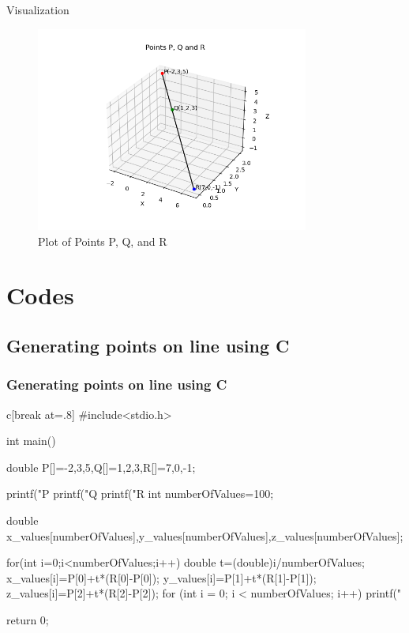\documentclass{beamer}
\theoremstyle{remark}
\numberwithin{equation}{section}
\begin{document}
\begin{frame}{Visualization}
    \begin{figure}
        \centering
        \includegraphics[width=0.8\textwidth]{fig/fig.png} 
	\caption{Plot of Points P, Q, and R}
    \end{figure}
\end{frame}


\section{Codes}
\subsection{Generating points on line using C}

\begin{frame}
\frametitle{Generating points on line using C}
\begin{mintedbox}{c}[break at=.8\textheight]
#include<stdio.h>

int main(){
	double P[]={-2,3,5},Q[]={1,2,3},R[]={7,0,-1};
	
	printf("P %
	printf("Q %
	printf("R %
	int numberOfValues=100;

	double x_values[numberOfValues],y_values[numberOfValues],z_values[numberOfValues];

	for(int i=0;i<numberOfValues;i++){
		double t=(double)i/numberOfValues;
		x_values[i]=P[0]+t*(R[0]-P[0]);
		y_values[i]=P[1]+t*(R[1]-P[1]);
		z_values[i]=P[2]+t*(R[2]-P[2]);
	}
	   for (int i = 0; i < numberOfValues; i++) {
        printf("%
    }

    return 0;
}

  \end{mintedbox}
\end{frame}
\end{document}
